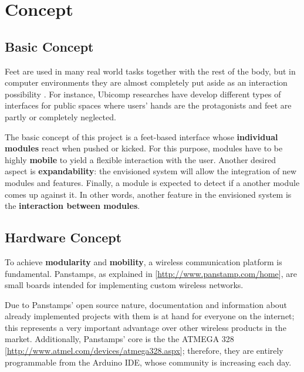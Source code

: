 \section{Concept}
\subsection{Basic Concept}
Feet are used in many real world tasks together with the rest of the body, but in computer environments they are almost completely put aside as an interaction possibility \cite{pakkanen}. For instance, Ubicomp researches have develop different types of interfaces for public spaces where users' hands are the protagonists and feet are partly or completely neglected. 

The basic concept of this project is a feet-based interface whose \textbf{individual modules} react when pushed or kicked. For this purpose, modules have to be highly \textbf {mobile} to yield a flexible interaction with the user. Another desired aspect is \textbf {expandability}: the envisioned system will allow the integration of new modules and features. %
Finally, a module is expected to detect if a another module comes up against it. In other words, another feature in the envisioned system is the \textbf{interaction between modules}. 


\subsection{Hardware Concept}
To achieve \textbf{modularity} and \textbf{mobility}, a wireless communication platform is fundamental.   
Panstamps, as explained in [{\url{http://www.panstamp.com/home}}], are small boards intended for implementing custom wireless networks.

Due to Panstamps' open source nature, documentation and information about already implemented projects with them is at hand for everyone on the internet; this represents a very important advantage over other wireless products in the market. %
Additionally, Panstamps' core is the the ATMEGA 328 [{\url{http://www.atmel.com/devices/atmega328.aspx}}]; therefore, they are entirely programmable from the Arduino IDE, whose community is increasing each day.%

